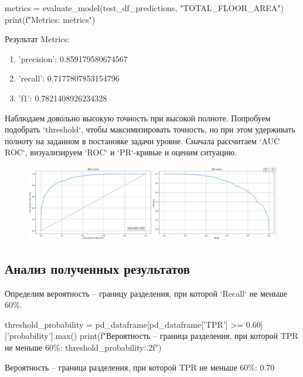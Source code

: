 \begin{code}
metrics = evaluate_model(test_df_predictions, "TOTAL_FLOOR_AREA")
print(f"Metrics: {metrics}")
\end{code}

\p Результат Metrics: 
\begin{enumerate}
\item 'precision': 0.859179580674567 
\item 'recall': 0.7177807853154796 
\item 'f1': 0.7821408926234328
\end{enumerate}

\p Наблюдаем довольно высокую точность при высокой полноте. Попробуем подобрать `threshold`, чтобы максимизировать точность, но при этом удерживать полноту на заданном в постановке задачи уровне.
Сначала рассчитаем `AUC ROC`, визуализируем `ROC` и `PR`-кривые и оценим ситуацию.

\begin{figure}
    \centering
    \includegraphics[width=\textwidth]{Content/Images/AUC_ROC.png}
    \label{fig:ZZFOONI}
\end{figure}

\vspace{\baselineskip}\subsection{Анализ полученных результатов}\vspace{\baselineskip}

\par Определим вероятность -- границу разделения, при которой `Recall` не меньше 60\%.
\begin{code}
threshold_probability = pd_dataframe[pd_dataframe['TPR'] >= 0.60]['probability'].max()
print(f"Вероятность -- граница разделения, при которой TPR не меньше 60\%: {threshold_probability:.2f}")
\end{code}
Вероятность -- граница разделения, при которой TPR не меньше 60\%: 0.70

